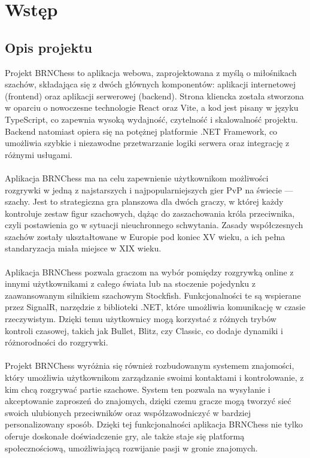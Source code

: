 \documentclass[12pt,a4paper]{article}
\begin{document}
\newpage

\tableofcontents

\newpage

\section{Wstęp}
\subsection{Opis projektu}

Projekt BRNChess to aplikacja webowa, zaprojektowana z myślą o miłośnikach szachów, składająca się z dwóch głównych komponentów: aplikacji internetowej (frontend) oraz aplikacji serwerowej (backend). Strona kliencka została stworzona w oparciu o nowoczesne technologie React oraz Vite, a kod jest pisany w języku TypeScript, co zapewnia wysoką wydajność, czytelność i skalowalność projektu. Backend natomiast opiera się na potężnej platformie .NET Framework, co umożliwia szybkie i niezawodne przetwarzanie logiki serwera oraz integrację z różnymi usługami.
\\\\
Aplikacja BRNChess ma na celu zapewnienie użytkownikom możliwości rozgrywki w jedną z najstarszych i najpopularniejszych gier PvP na świecie — szachy. Jest to strategiczna gra planszowa dla dwóch graczy, w której każdy kontroluje zestaw figur szachowych, dążąc do zaszachowania króla przeciwnika, czyli postawienia go w sytuacji nieuchronnego schwytania. Zasady współczesnych szachów zostały ukształtowane w Europie pod koniec XV wieku, a ich pełna standaryzacja miała miejsce w XIX wieku.
\\\\
Aplikacja BRNChess pozwala graczom na wybór pomiędzy rozgrywką online z innymi użytkownikami z całego świata lub na stoczenie pojedynku z zaawansowanym silnikiem szachowym Stockfish. Funkcjonalności te są wspierane przez SignalR, narzędzie z biblioteki .NET, które umożliwia komunikację w czasie rzeczywistym. Dzięki temu użytkownicy mogą korzystać z różnych trybów kontroli czasowej, takich jak Bullet, Blitz, czy Classic, co dodaje dynamiki i różnorodności do rozgrywki.
\\\\
Projekt BRNChess wyróżnia się również rozbudowanym systemem znajomości, który umożliwia użytkownikom zarządzanie swoimi kontaktami i kontrolowanie, z kim chcą rozgrywać partie szachowe. System ten pozwala na wysyłanie i akceptowanie zaproszeń do znajomych, dzięki czemu gracze mogą tworzyć sieć swoich ulubionych przeciwników oraz współzawodniczyć w bardziej personalizowany sposób. Dzięki tej funkcjonalności aplikacja BRNChess nie tylko oferuje doskonałe doświadczenie gry, ale także staje się platformą społecznościową, umożliwiającą rozwijanie pasji w gronie znajomych.
\end{document}
